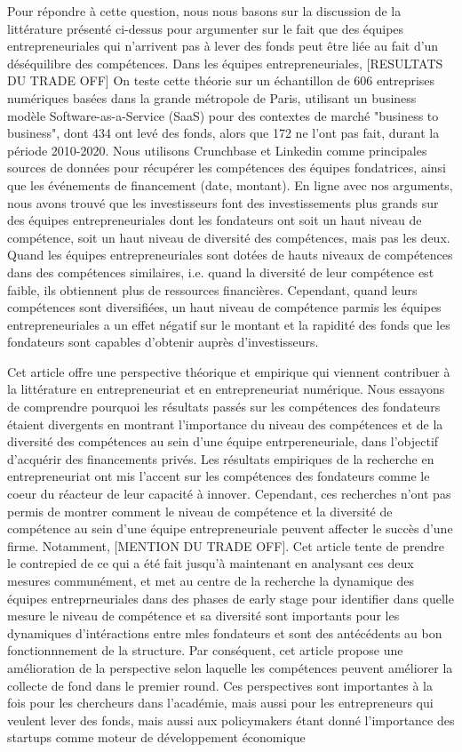 \documentclass[11pt]{article}
\begin{document}
Pour répondre à cette question, nous nous basons sur la discussion de la littérature présenté ci-dessus pour argumenter sur le fait que des équipes entrepreneuriales qui n'arrivent pas à lever des fonds peut être liée au fait d'un déséquilibre des compétences. Dans les équipes entrepreneuriales, [RESULTATS DU TRADE OFF] On teste cette théorie sur un échantillon de 606 entreprises numériques basées dans la grande métropole de Paris, utilisant un business modèle Software-as-a-Service (SaaS) pour des contextes de marché "business to business", dont 434 ont levé des fonds, alors que 172 ne l'ont pas fait, durant la période 2010-2020. Nous utilisons Crunchbase et Linkedin comme principales sources de données pour récupérer les compétences des équipes fondatrices, ainsi que les événements de financement (date, montant). En ligne avec nos arguments, nous avons trouvé que les investisseurs font des investissements plus grands sur des équipes entrepreneuriales dont les fondateurs ont soit un haut niveau de compétence, soit un haut niveau de diversité des compétences, mais pas les deux. Quand les équipes entrepreneuriales sont dotées de hauts niveaux de compétences dans des compétences similaires, i.e. quand la diversité de leur compétence est faible, ils obtiennent plus de ressources financières. Cependant, quand leurs compétences sont diversifiées, un haut niveau de compétence parmis les équipes entrepreneuriales a un effet négatif sur le montant et la rapidité des fonds que les fondateurs sont capables d'obtenir auprès d'investisseurs.

Cet article offre une perspective théorique et empirique qui viennent contribuer à la littérature en entrepreneuriat et en entrepreneuriat numérique. Nous essayons de comprendre pourquoi les résultats passés sur les compétences des fondateurs étaient divergents en montrant l'importance du niveau des compétences et de la diversité des compétences au sein d'une équipe entrpereneuriale, dans l'objectif d'acquérir des financements privés. Les résultats empiriques de la recherche en entrepreneuriat ont mis l'accent sur les compétences des fondateurs comme le coeur du réacteur de leur capacité à innover. Cependant, ces recherches n'ont pas permis de montrer comment le niveau de compétence et la diversité de compétence au sein d'une équipe entrepreneuriale peuvent affecter le succès d'une firme. Notamment, [MENTION DU TRADE OFF]. Cet article tente de prendre le contrepied de ce qui a été fait jusqu'à maintenant en analysant ces deux mesures communément, et met au centre de la recherche la dynamique des équipes entreprneuriales dans des phases de early stage pour identifier dans quelle mesure le niveau de compétence et sa diversité sont importants pour les dynamiques d'intéractions entre mles fondateurs et sont des antécédents au bon fonctionnnement de la structure. Par conséquent, cet article propose une amélioration de la perspective selon laquelle les compétences peuvent améliorer la collecte de fond dans le premier round. Ces perspectives sont importantes à la fois pour les chercheurs dans l'académie, mais aussi pour les entrepreneurs qui veulent lever des fonds, mais aussi aux policymakers étant donné l'importance des startups comme moteur de développement économique  
\end{document}
